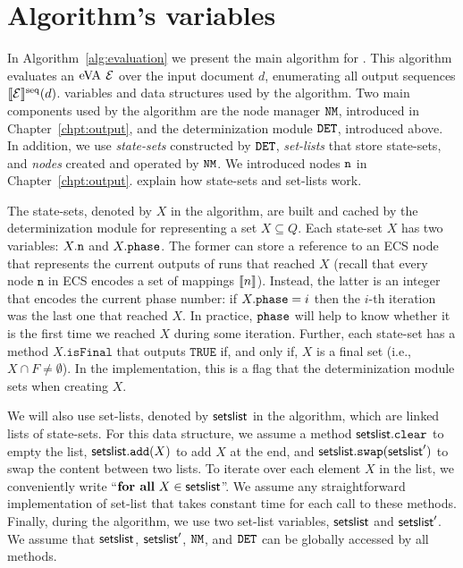 \section{Algorithm's variables}
In Algorithm~\ref{alg:evaluation} we present the main algorithm for \rematch.
This algorithm evaluates an $\mathrm{eVA}$ $\mathcal{E}$ over the input document $d$,
enumerating all output sequences $\llbracket\mathcal{E}\rrbracket^{\operatorname{seq}}(d)$. %
variables and data structures used by the algorithm.
%
Two main components used by the algorithm are the node manager $\mathtt{NM}$, introduced
in Chapter~\ref{chpt:output}, and the determinization module $\mathtt{DET}$, introduced
above. In addition, we use \emph{state-sets} constructed by $\mathtt{DET}$,
\emph{set-lists} that store state-sets, and \emph{nodes} created and operated by
$\mathtt{NM}$. We introduced nodes $\mathtt{n}$ in Chapter~\ref{chpt:output}. %
explain how state-sets and set-lists work.


The state-sets, denoted by $X$ in the algorithm, are built and cached by the
determinization module for representing a set $X \subseteq Q$. Each state-set
$X$ has two variables: $X.\mathtt{n}$ and $X.\texttt{phase}$. The former can store a
reference to an ECS node that represents the current outputs of runs that
reached $X$ (recall that every node $\texttt{n}$ in ECS encodes a set of
mappings $\llbracket n\rrbracket$). Instead, the latter is an integer that encodes the current
phase number: if $X.\texttt{phase} = i$ then the $i$-th iteration was the last one that
reached $X$. In practice, $\texttt{phase}$ will help to know whether it is the first
time we reached $X$ during some iteration. Further, each state-set has a method
$X.\texttt{isFinal}$ that outputs $\texttt{TRUE}$ if, and only if, $X$ is a
final set (i.e., $X \cap F \neq \emptyset$). In the implementation, this is a
flag that the determinization module sets when creating $X$.

We will also use set-lists, denoted by $\textsf{setslist}$ in the algorithm, which
are linked lists of state-sets. For this data structure, we assume a method
$\textsf{setslist}.\texttt{clear}$ to empty the list,
$\textsf{setslist}.\texttt{add}(X)$ to add $X$ at the end, and
$\textsf{setslist}.\texttt{swap}(\textsf{setslist}')$ to swap the content between two
lists. To iterate over each element $X$ in the list, we conveniently write
``$\textbf{for all} \ X \in \textsf{setslist}$''. We assume any straightforward
implementation of set-list that takes constant time for each call to these
methods. Finally, during the algorithm, we use two set-list variables,
$\textsf{setslist}$ and $\textsf{setslist}'$. We assume that $\textsf{setslist}$,
$\textsf{setslist}'$, $\mathtt{NM}$, and $\mathtt{DET}$ can be globally accessed by all methods.

